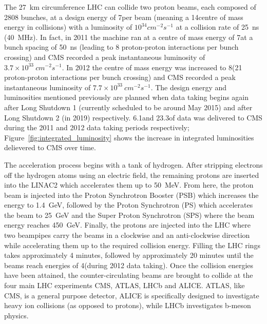 
The 27~km circumference LHC can collide two proton beams, each composed of 2808 bunches, at a design energy of
7\TeV per beam (meaning a 14\TeV centre of mass energy in collisions) with a luminosity of $10^{34}
cm^{-2}s^{-1}$ at a collision rate of 25~ns (40~MHz). In fact, in 2011 the machine ran at a centre of mass
energy of 7\TeV at a bunch spacing of 50~ns (leading to 8 proton-proton interactions per bunch crossing) and
CMS recorded a peak instantaneous luminosity of $3.7\times10^{33}~cm^{-2}s^{-1}$. In 2012 the centre of mass
energy was increased to 8\TeV (21 proton-proton interactions per bunch crossing) and CMS recorded a peak
instantaneous luminosity of $7.7\times10^{33}~cm^{-2}s^{-1}$. The design energy and luminosities mentioned
previously are planned when data taking begins again after Long Shutdown 1 (currently scheduled to be around
May 2015) and after Long Shutdown 2 (in 2019) respectively. 6.1\fbinv and 23.3\fbinv of
data was delivered to CMS during the 2011 and 2012 data taking periods respectively;
Figure~\ref{fig:integrated_luminosity} shows the increase in integrated luminosities delievered to CMS over
time.

The acceleration process begins with a tank of hydrogen. After stripping electrons off the hydrogen atoms
using an electric field, the remaining protons are inserted into the LINAC2 which accelerates them up to
50~MeV. From here, the proton beam is injected into the Proton Synchrotron Booster (PSB) which increases the
energy to 1.4~GeV, followed by the Proton Synchrotron (PS) which accelerates the beam to 25~GeV and the Super
Proton Synchrotron (SPS) where the beam energy reaches 450~GeV. Finally, the protons are injected into the LHC
where two beampipes carry the beams in a clockwise and an anti-clockwise direction while accelerating them up
to the required collision energy. Filling the LHC rings takes approximately 4 minutes, followed by
approximately 20 minutes until the beams reach energies of 4\TeV (during 2012 data taking). Once the collision
energies have been attained, the counter-circulating beams are brought to collide at the four main LHC
experiments CMS, ATLAS, LHCb and ALICE. ATLAS, like CMS, is a general purpose detector, ALICE is specifically
designed to investigate heavy ion collisions (as opposed to protons), while LHCb investigates b-meson physics.

